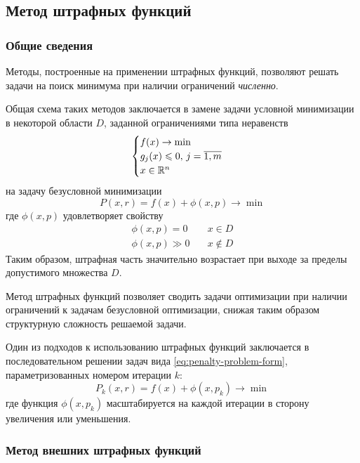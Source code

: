 \subsection{Метод штрафных функций}
\label{sec:penalty}

\subsubsection{Общие сведения}

Методы, построенные на применении штрафных функций, позволяют решать
задачи на поиск минимума при наличии ограничений \emph{численно}.

Общая схема таких методов заключается в замене задачи условной
минимизации в некоторой области $D$, заданной ограничениями типа
неравенств
\begin{equation}
  \label{eq:penalty-problem-form-initial}
  \begin{cases}
    f(x) \to \min \\
    g_j(x) \leqslant 0,\, j=\overline{1,m} \\
    x \in \mathbb{R}^n
  \end{cases}
\end{equation}
на задачу безусловной минимизации
\begin{equation}
  \label{eq:penalty-problem-form}
  P(x, r) = f(x) + \phi(x, p) \to \min
\end{equation}
где  $\phi(x, p)$ удовлетворяет свойству
\begin{align*}
  \phi(x, p) = 0 &\quad x \in D\\
  \phi(x, p) \gg 0 &\quad x \notin D
\end{align*}
Таким образом, штрафная часть значительно возрастает при выходе за
пределы допустимого множества $D$.

Метод штрафных функций позволяет сводить задачи оптимизации при
наличии ограничений к задачам безусловной оптимизации, снижая таким
образом структурную сложность решаемой задачи.

Один из подходов к использованию штрафных функций заключается в
последовательном решении задач вида \ref{eq:penalty-problem-form},
параметризованных номером итерации $k$:
\begin{equation}
  \label{eq:penalty-iter}
  P_k(x, r) = f(x) + \phi(x, p_k) \to \min
\end{equation}
где функция $\phi(x, p_k)$ масштабируется на каждой итерации в сторону
увеличения или уменьшения.

\subsubsection{Метод внешних штрафных функций}

